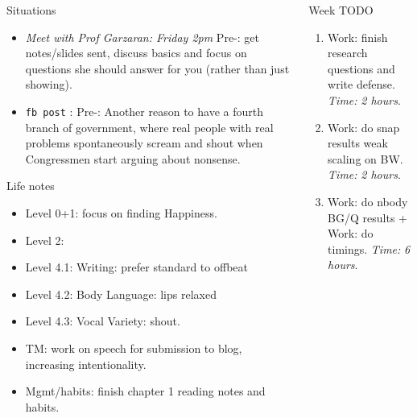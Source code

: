 \documentclass[serif, mathserif, final]{beamer}
\newcommand{\timeEst}[1]{\textit{Time:} \textit{#1}}
\begin{document}
\begin{frame}{}
\begin{columns}
\begin{column}{0.25\linewidth}
\begin{block}{ Situations}
\begin{itemize}
\item \tiny \textit{Meet with Prof Garzaran: Friday 2pm} Pre-: get notes/slides sent, discuss basics and focus on questions she should answer for you (rather than just showing). 
\item \tiny \texttt{fb post} : Pre-: Another reason to have a fourth branch of government, where real people with real problems spontaneously scream and shout when Congressmen start arguing
about nonsense.

    \end{itemize}
  \end{block} 

  
  \begin{block} {Life notes} 
    \begin{itemize} 
      \tiny \item \tiny Level 0+1: focus on finding Happiness. 
    \item \tiny Level 2: 
    \item \tiny Level 4.1: Writing: prefer standard to offbeat 
    \item \tiny Level 4.2: Body Language: lips relaxed
    \item \tiny Level 4.3: Vocal Variety: shout. 
    \item \tiny TM: work on speech for submission to blog, increasing intentionality. 
    \item \tiny Mgmt/habits: finish chapter 1 reading notes and habits. 
    \end{itemize} 
    
  \end{block} 
\end{column} %
\begin{column}{0.50\linewidth}
  
  \begin{block}{Week TODO} 
    \begin{enumerate} 
    \item \tiny Work: finish research questions and write defense. \timeEst{2 hours}.  

    \item \tiny Work: do snap results weak scaling on BW. \timeEst{2 hours}. 

    \item \tiny Work: do nbody BG/Q results + Work: do
      timings. \timeEst{6 hours}. 


\end{enumerate}
\end{block}
\end{column}
\end{columns}
\end{frame}
\end{document}
